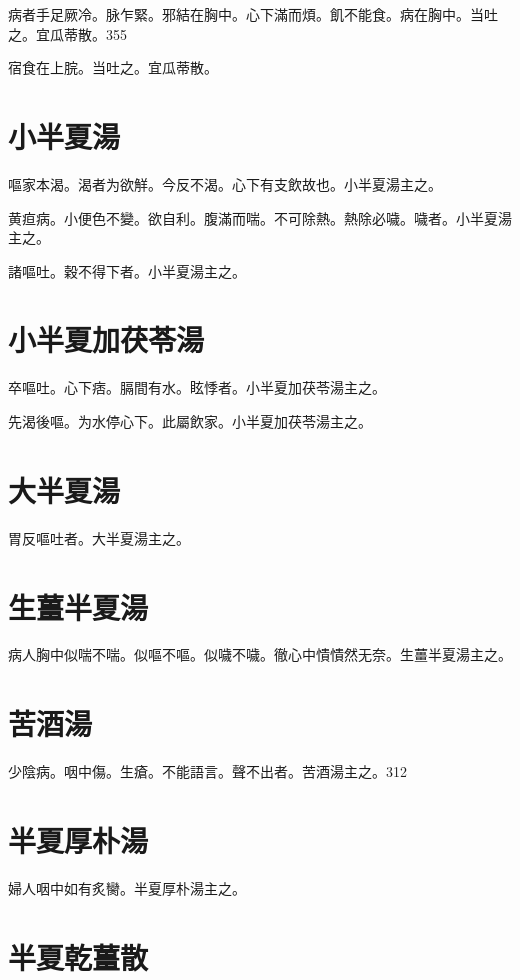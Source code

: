 \documentclass[12pt,twoside,UTF8,b5paper]{ctexbook}
\begin{document}
病者手足厥冷。脉乍緊。邪結在胸中。心下滿而煩。飢不能食。病在胸中。当吐之。宜瓜蒂散。355

宿食在上脘。当吐之。宜瓜蒂散。

\section{小半夏湯}

嘔家本渴。渴者为欲觧。今反不渴。心下有支飲故也。小半夏湯主之。

黄疸病。小便色不變。欲自利。腹滿而喘。不可除熱。熱除必噦。噦者。小半夏湯主之。

諸嘔吐。穀不得下者。小半夏湯主之。

\section{小半夏加茯苓湯}

卒嘔吐。心下痞。膈間有水。眩悸者。{小}半夏加茯苓湯主之。

先渴後嘔。为水停心下。此屬飲家。小半夏{加}茯苓湯主之。

\section{大半夏湯}

胃反嘔吐者。大半夏湯主之。

\section{生薑半夏湯}

病人胸中似喘不喘。似嘔不嘔。似噦不噦。徹心中憒憒然无奈。生薑半夏湯主之。

\section{苦酒湯}

少陰病。咽中傷。生瘡。不能語言。聲不出者。苦酒湯主之。312

\section{半夏厚朴湯}

婦人咽中如有炙臠。半夏厚朴湯主之。

\section{半夏乾薑散}
\end{document}
